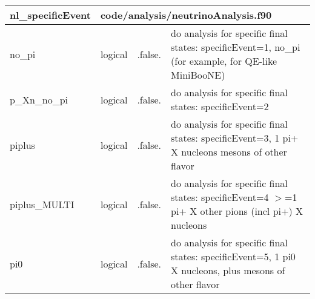 \documentclass{article}
\begin{document}
\begin{longtable}{llll}
\toprule
\textbf{\large{nl\_specificEvent}} & \multicolumn{3}{l}{\footnotesize{code/analysis/neutrinoAnalysis.f90}}\\*
\midrule
\endfirsthead
\midrule
\endhead
no\_pi & \begin{minipage}[t]{2cm}logical\end{minipage} & \begin{minipage}[t]{2cm}.false.\end{minipage} & \begin{minipage}[t]{12cm}do analysis for specific final states: specificEvent=1, no\_pi (for example, for QE-like MiniBooNE)\end{minipage}\\*
\midrule
p\_Xn\_no\_pi & \begin{minipage}[t]{2cm}logical\end{minipage} & \begin{minipage}[t]{2cm}.false.\end{minipage} & \begin{minipage}[t]{12cm}do analysis for specific final states: specificEvent=2\end{minipage}\\*
\midrule
piplus & \begin{minipage}[t]{2cm}logical\end{minipage} & \begin{minipage}[t]{2cm}.false.\end{minipage} & \begin{minipage}[t]{12cm}do analysis for specific final states: specificEvent=3, 1 pi+ X nucleons mesons of other flavor\end{minipage}\\*
\midrule
piplus\_MULTI & \begin{minipage}[t]{2cm}logical\end{minipage} & \begin{minipage}[t]{2cm}.false.\end{minipage} & \begin{minipage}[t]{12cm}do analysis for specific final states: specificEvent=4 $>$=1 pi+  X other pions (incl pi+) X nucleons\end{minipage}\\*
\midrule
pi0 & \begin{minipage}[t]{2cm}logical\end{minipage} & \begin{minipage}[t]{2cm}.false.\end{minipage} & \begin{minipage}[t]{12cm}do analysis for specific final states: specificEvent=5, 1 pi0 X nucleons, plus mesons of other flavor\end{minipage}\\*

\end{longtable}
\end{document}
